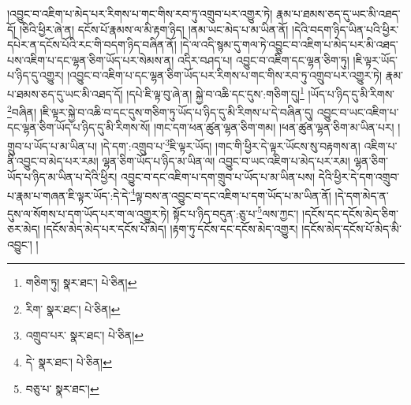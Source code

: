 །འབྱུང་བ་འཇིག་པ་མེད་པར་རིགས་པ་གང་གིས་རབ་ཏུ་འགྲུབ་པར་འགྱུར་ཏེ། རྣམ་པ་ཐམས་ཅད་དུ་ཡང་མི་འཐད་དོ། །ཅིའི་ཕྱིར་ཞེ་ན། དངོས་པོ་རྣམས་ལ་མི་རྟག་ཉིད། །ནམ་ཡང་མེད་པ་མ་ཡིན་ནོ། །དེའི་བདག་ཉིད་ཡིན་པའི་ཕྱིར་དཔེར་ན་དངོས་པོའི་རང་གི་བདག་ཉིད་བཞིན་ནོ། །དེ་ལ་འདི་སྙམ་དུ་གལ་ཏེ་འབྱུང་བ་འཇིག་པ་མེད་པར་མི་འཐད་པས་འཇིག་པ་དང་ལྷན་ཅིག་ཡོད་པར་སེམས་ན། འདིར་བཤད་པ། འབྱུང་བ་འཇིག་དང་ལྷན་ཅིག་ཏུ། །ཇི་ལྟར་ཡོད་པ་ཉིད་དུ་འགྱུར། །འབྱུང་བ་འཇིག་པ་དང་ལྷན་ཅིག་ཡོད་པར་རིགས་པ་གང་གིས་རབ་ཏུ་འགྲུབ་པར་འགྱུར་ཏེ། རྣམ་པ་ཐམས་ཅད་དུ་ཡང་མི་འཐད་དོ། །དཔེ་ཇི་ལྟ་བུ་ཞེ་ན། སྐྱེ་བ་འཆི་དང་དུས་:གཅིག་དུ།\footnote{གཅིག་ཏུ།  སྣར་ཐང་།  པེ་ཅིན། } །ཡོད་པ་ཉིད་དུ་མི་རིགས་\footnote{རིག་  སྣར་ཐང་།  པེ་ཅིན། }བཞིན། །ཇི་ལྟར་སྐྱེ་བ་འཆི་བ་དང་དུས་གཅིག་ཏུ་ཡོད་པ་ཉིད་དུ་མི་རིགས་པ་དེ་བཞིན་དུ། འབྱུང་བ་ཡང་འཇིག་པ་དང་ལྷན་ཅིག་ཡོད་པ་ཉིད་དུ་མི་རིགས་སོ། །གང་དག་ཕན་ཚུན་ལྷན་ཅིག་གམ། །ཕན་ཚུན་ལྷན་ཅིག་མ་ཡིན་པར། །གྲུབ་པ་ཡོད་པ་མ་ཡིན་པ། །དེ་དག་:འགྲུབ་པ་\footnote{འགྲུབ་པར་  སྣར་ཐང་།  པེ་ཅིན། }ཇི་ལྟར་ཡོད། །གང་གི་ཕྱིར་དེ་ལྟར་ཡོངས་སུ་བརྟགས་ན། འཇིག་པ་ནི་འབྱུང་བ་མེད་པར་རམ། ལྷན་ཅིག་ཡོད་པ་ཉིད་མ་ཡིན་ལ། འབྱུང་བ་ཡང་འཇིག་པ་མེད་པར་རམ། ལྷན་ཅིག་ཡོད་པ་ཉིད་མ་ཡིན་པ་དེའི་ཕྱིར། འབྱུང་བ་དང་འཇིག་པ་དག་གྲུབ་པ་ཡོད་པ་མ་ཡིན་པས། དེའི་ཕྱིར་དེ་དག་འགྲུབ་པ་རྣམ་པ་གཞན་ཇི་ལྟར་ཡོད་:དེ་དེ་\footnote{དེ་  སྣར་ཐང་།  པེ་ཅིན། }ལྟ་བས་ན་འབྱུང་བ་དང་འཇིག་པ་དག་ཡོད་པ་མ་ཡིན་ནོ། །དེ་དག་མེད་ན་དུས་ལ་སོགས་པ་དག་ཡོད་པར་ག་ལ་འགྱུར་ཏེ། སྟོང་པ་ཉིད་བདུན་:ཅུ་པ་\footnote{བཅུ་པ་  སྣར་ཐང་། }ལས་ཀྱང་། །དངོས་དང་དངོས་མེད་ཅིག་ཅར་མེད། །དངོས་མེད་མེད་པར་དངོས་པོ་མེད། །རྟག་ཏུ་དངོས་དང་དངོས་མེད་འགྱུར། །དངོས་མེད་དངོས་པོ་མེད་མི་འབྱུང་། །

